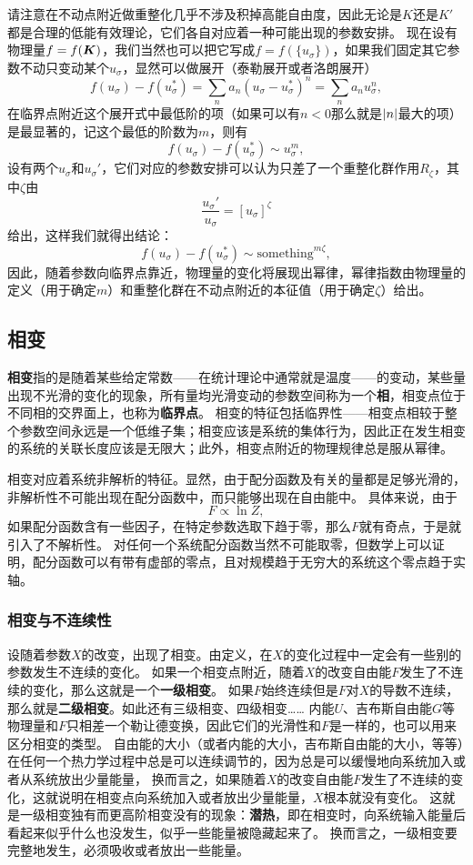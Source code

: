 \documentclass[hyperref, UTF8, a4paper]{ctexart}
\begin{document}
请注意在不动点附近做重整化几乎不涉及积掉高能自由度，因此无论是$K$还是$K'$都是合理的低能有效理论，它们各自对应着一种可能出现的参数安排。
现在设有物理量$f = f(\vb*{K})$，我们当然也可以把它写成$f=f(\{u_\sigma\})$，如果我们固定其它参数不动只变动某个$u_\sigma$，显然可以做展开（泰勒展开或者洛朗展开）
\[
    f(u_\sigma) - f(u_\sigma^*) = \sum_n a_n (u_\sigma - u_\sigma^*)^n = \sum_n a_n u_\sigma^n,
\]
在临界点附近这个展开式中最低阶的项（如果可以有$n<0$那么就是$\abs{n}$最大的项）是最显著的，记这个最低的阶数为$m$，则有
\[
    f(u_\sigma) - f(u_\sigma^*) \sim u_\sigma^m,
\]
设有两个$u_\sigma$和$u_\sigma'$，它们对应的参数安排可以认为只差了一个重整化群作用$R_\zeta$，其中$\zeta$由
\[
    \frac{u_\sigma'}{u_\sigma} = [u_\sigma]^\zeta
\]
给出，这样我们就得出结论：
\[
    f(u_\sigma) - f(u_\sigma^*) \sim \text{something}^{m \zeta},
\]
因此，随着参数向临界点靠近，物理量的变化将展现出幂律，幂律指数由物理量的定义（用于确定$m$）和重整化群在不动点附近的本征值（用于确定$\zeta$）给出。

\subsection{相变}

\textbf{相变}指的是随着某些给定常数——在统计理论中通常就是温度——的变动，某些量出现不光滑的变化的现象，所有量均光滑变动的参数空间称为一个\textbf{相}，相变点位于不同相的交界面上，也称为\textbf{临界点}。
相变的特征包括临界性——相变点相较于整个参数空间永远是一个低维子集；相变应该是系统的集体行为，因此正在发生相变的系统的关联长度应该是无限大；此外，相变点附近的物理规律总是服从幂律。

相变对应着系统非解析的特征。显然，由于配分函数及有关的量都是足够光滑的，非解析性不可能出现在配分函数中，而只能够出现在自由能中。
具体来说，由于
\[
    F \propto \ln Z,
\]
如果配分函数含有一些因子，在特定参数选取下趋于零，那么$F$就有奇点，于是就引入了不解析性。
对任何一个系统配分函数当然不可能取零，但数学上可以证明，配分函数可以有带有虚部的零点，且对规模趋于无穷大的系统这个零点趋于实轴。

\subsubsection{相变与不连续性}

设随着参数$X$的改变，出现了相变。由定义，在$X$的变化过程中一定会有一些别的参数发生不连续的变化。
如果一个相变点附近，随着$X$的改变自由能$F$发生了不连续的变化，那么这就是一个\textbf{一级相变}。
如果$F$始终连续但是$F$对$X$的导数不连续，那么就是\textbf{二级相变}。如此还有三级相变、四级相变……
内能$U$、吉布斯自由能$G$等物理量和$F$只相差一个勒让德变换，因此它们的光滑性和$F$是一样的，也可以用来区分相变的类型。
自由能的大小（或者内能的大小，吉布斯自由能的大小，等等）在任何一个热力学过程中总是可以连续调节的，因为总是可以缓慢地向系统加入或者从系统放出少量能量，
换而言之，如果随着$X$的改变自由能$F$发生了不连续的变化，这就说明在相变点向系统加入或者放出少量能量，$X$根本就没有变化。
这就是一级相变独有而更高阶相变没有的现象：\textbf{潜热}，即在相变时，向系统输入能量后看起来似乎什么也没发生，似乎一些能量被隐藏起来了。
换而言之，一级相变要完整地发生，必须吸收或者放出一些能量。
\end{document}
